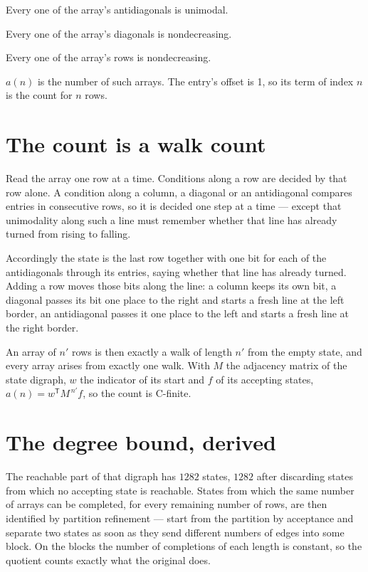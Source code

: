 \documentclass[11pt]{article}
\theoremstyle{definition}
\begin{document}
Every one of the array's antidiagonals is unimodal.

Every one of the array's diagonals is nondecreasing.

Every one of the array's rows is nondecreasing.

$a(n)$ is the number of such arrays. The entry's offset is 1, so its term of index $n$ is the count for $n$ rows.

\section{The count is a walk count}

Read the array one row at a time. Conditions along a row are decided by that row alone. A condition along a column, a diagonal or an antidiagonal compares entries in consecutive rows, so it is decided one step at a time --- except that unimodality along such a line must remember whether that line has already turned from rising to falling.

Accordingly the state is the last row together with one bit for each of the antidiagonals through its entries, saying whether that line has already turned. Adding a row moves those bits along the line: a column keeps its own bit, a diagonal passes its bit one place to the right and starts a fresh line at the left border, an antidiagonal passes it one place to the left and starts a fresh line at the right border.

An array of $n'$ rows is then exactly a walk of length $n'$ from the empty state, and every array arises from exactly one walk. With $M$ the adjacency matrix of the state digraph, $w$ the indicator of its start and $f$ of its accepting states, $a(n) = w^{\mathsf T}M^{\,n'}f$, so the count is C-finite.

\section{The degree bound, derived}

The reachable part of that digraph has $1282$ states, $1282$ after discarding states from which no accepting state is reachable. States from which the same number of arrays can be completed, for every remaining number of rows, are then identified by partition refinement --- start from the partition by acceptance and separate two states as soon as they send different numbers of edges into some block. On the blocks the number of completions of each length is constant, so the quotient counts exactly what the original does.
\end{document}
